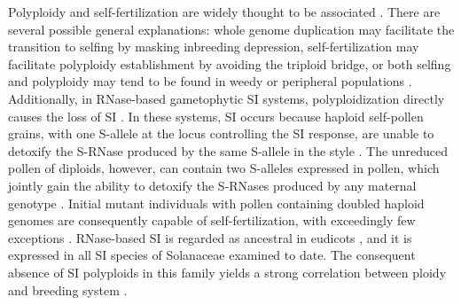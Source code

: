 Polyploidy and self-fertilization are widely thought to be associated \citep{stebbins1950}.
There are several possible general explanations: whole genome duplication may facilitate the transition to selfing by masking inbreeding depression, self-fertilization may facilitate polyploidy establishment by avoiding the triploid bridge, or both selfing and polyploidy may tend to be found in weedy or peripheral populations \citep{ramsey_1998, barringer2007, barrett2008, husband2008}.
Additionally, in RNase-based gametophytic SI systems, polyploidization directly causes the loss of SI \citep{stout1942, lewis1947}. %
In these systems, SI occurs because haploid self-pollen grains, with one S-allele at the locus controlling the SI response, are unable to detoxify the S-RNase produced by the same S-allele in the style \citep{kubo2010}.
The unreduced pollen of diploids, however, can contain two S-alleles expressed in pollen, which jointly gain the ability to detoxify the S-RNases produced by any maternal genotype \citep{entani1999, tsukamoto2005, kubo2010}.
Initial mutant individuals with pollen containing doubled haploid genomes are consequently capable of self-fertilization, with exceedingly few exceptions \citep{hauck_2002, nunes_2006}.
RNase-based SI is regarded as ancestral in eudicots \citep{igic_2001,steinbachs_2002}, and it is expressed in all SI species of Solanaceae examined to date.
The consequent absence of SI polyploids in this family yields a strong correlation between ploidy and breeding system \citep{robertson_2011}.

